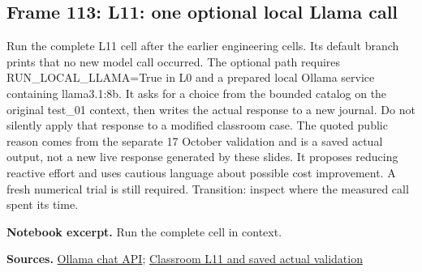 \documentclass[11pt]{article}
\newcommand{\Code}[1]{}
\begin{document}
\subsection*{Frame 113: L11: one optional local Llama call}
Run the complete L11 cell after the earlier engineering cells. Its default branch prints that no new model call occurred. The optional path requires RUN\_LOCAL\_LLAMA=True in L0 and a prepared local Ollama service containing llama3.1:8b. It asks for a choice from the bounded catalog on the original test\_01 context, then writes the actual response to a new journal. Do not silently apply that response to a modified classroom case. The quoted public reason comes from the separate 17 October validation and is a saved actual output, not a new live response generated by these slides. It proposes reducing reactive effort and uses cautious language about possible cost improvement. A fresh numerical trial is still required. Transition: inspect where the measured call spent its time.\par
\par\noindent\begin{minipage}{\linewidth}\textbf{Notebook excerpt.} Run the complete cell in context.\par \Code{E07.py}\end{minipage}\par
\par\nopagebreak\begin{minipage}{\linewidth}{\footnotesize\color{slate}\textbf{Sources.} \href{https://docs.ollama.com/api/chat}{Ollama chat API}; \href{../Classroom_Labs.html}{Classroom L11 and saved actual validation}\par}\end{minipage}\par\medskip
\end{document}

